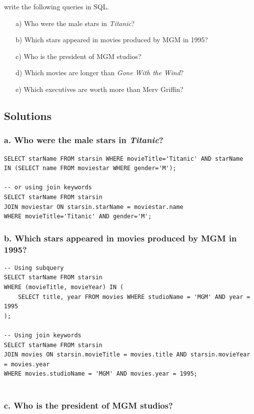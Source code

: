 \documentclass{cshwk}
\begin{document}
write the following queries in SQL.

\begin{enumerate}
    \item[a)] Who were the male stars in \textit{Titanic}?
    \item[b)] Which stars appeared in movies produced by MGM in 1995?
    \item[c)] Who is the president of MGM studios?
    \item[d)] Which movies are longer than \textit{Gone With the Wind}?
    \item[e)] Which executives are worth more than Merv Griffin?
\end{enumerate}

\subsection{Solutions}

\subsubsection*{a. Who were the male stars in \textit{Titanic}?}

\begin{lstlisting}
SELECT starName FROM starsin WHERE movieTitle='Titanic' AND starName IN (SELECT name FROM moviestar WHERE gender='M');

-- or using join keywords
SELECT starName FROM starsin
JOIN moviestar ON starsin.starName = moviestar.name
WHERE movieTitle='Titanic' AND gender='M';
\end{lstlisting}

\subsubsection*{b. Which stars appeared in movies produced by MGM in 1995?}

\begin{lstlisting}
-- Using subquery
SELECT starName FROM starsin
WHERE (movieTitle, movieYear) IN (
    SELECT title, year FROM movies WHERE studioName = 'MGM' AND year = 1995
);

-- Using join keywords
SELECT starName FROM starsin
JOIN movies ON starsin.movieTitle = movies.title AND starsin.movieYear = movies.year
WHERE movies.studioName = 'MGM' AND movies.year = 1995;
    
\end{lstlisting}

\subsubsection*{c. Who is the president of MGM studios?}
\end{document}
